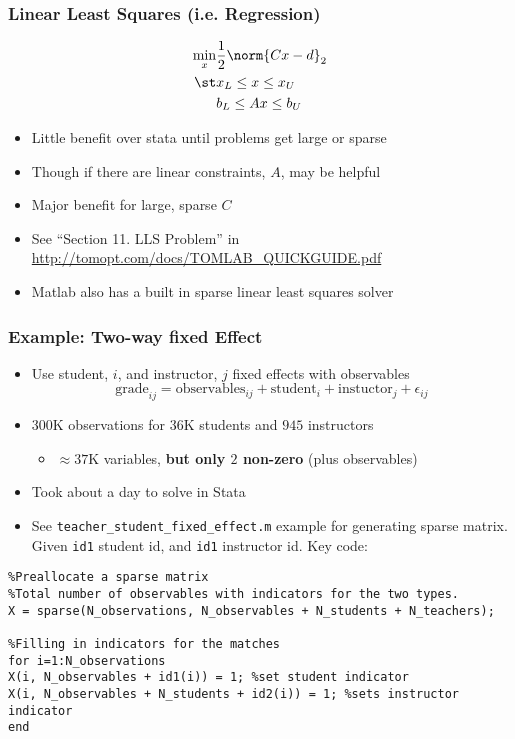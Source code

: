 \documentclass[nofootline]{etk-presentation}
\begin{document}
\begin{frame}[fragile]	\frametitle{Linear Least Squares (i.e. Regression)}

	\begin{align*}
	\min_x &\frac{1}{2}\norm{C x - d}_2\\
	\st & x_L \leq x \leq x_U\\
	& b_L \leq A x \leq b_U
	\end{align*}
	
	\begin{itemize}
		\item Little benefit over stata until problems get large or sparse
		\item Though if there are linear constraints, $A$, may be helpful
		\item Major benefit for large, sparse $C$
		\item See ``Section 11. LLS Problem'' in \url{http://tomopt.com/docs/TOMLAB_QUICKGUIDE.pdf}
		\item Matlab also has a built in sparse linear least squares solver
	\end{itemize}
\end{frame}


\begin{frame}[fragile]	\frametitle{Example: Two-way fixed Effect}
	\begin{itemize}
		\item 	Use student, $i$, and instructor, $j$ fixed effects with observables
			$$
		\text{grade}_{ij} = \text{observables}_{ij} + \text{student}_i + \text{instuctor}_j + \epsilon_{ij}
		$$
		\item $300$K observations for $36$K students and $945$ instructors
		\begin{itemize}
			\item $\approx 37$K variables, \textbf{but only $2$ non-zero} (plus observables)
		\end{itemize}
		\item Took about a day to solve in Stata
		\item See \verb!teacher_student_fixed_effect.m! example for generating sparse matrix.  Given \verb!id1! student id, and \verb!id1! instructor id.  Key code:
	\end{itemize}
\begin{verbatim}
%Preallocate a sparse matrix
%Total number of observables with indicators for the two types.
X = sparse(N_observations, N_observables + N_students + N_teachers); 

%Filling in indicators for the matches
for i=1:N_observations
X(i, N_observables + id1(i)) = 1; %set student indicator
X(i, N_observables + N_students + id2(i)) = 1; %sets instructor indicator
end
\end{verbatim}
\end{frame}
\end{document}
